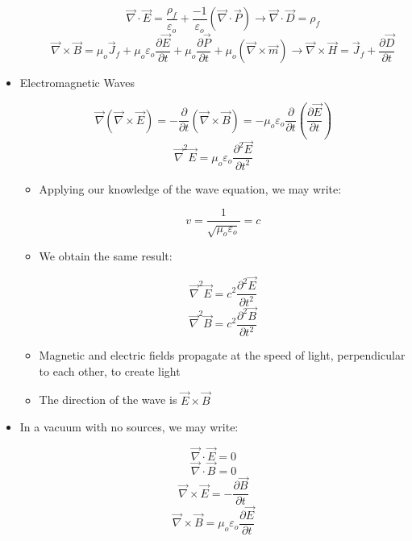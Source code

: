 \begin{itemize}
\begin{itemize}
        $$\vec{\nabla}\cdot\vec{E}=\frac{\rho_f}{\varepsilon_o}+\frac{-1}{\varepsilon_o}(\vec{\nabla}\cdot\vec{P})\rightarrow \vec{\nabla}\cdot\vec{D}=\rho_f$$
        $$\vec{\nabla}\times\vec{B}=\mu_o\vec{J}_f+\mu_o\varepsilon_o\frac{\partial\vec{E}}{\partial t}+\mu_o\frac{\partial\vec{P}}{\partial t}+\mu_o(\vec{\nabla}\times\vec{m})\rightarrow \vec{\nabla}\times\vec{H}=\vec{J}_f+\frac{\partial\vec{D}}{\partial t}$$

    \end{itemize}

  \item Electromagnetic Waves

    $$\vec{\nabla}(\vec{\nabla}\times\vec{E})=-\frac{\partial}{\partial t}(\vec{\nabla}\times\vec{B})=-\mu_o\varepsilon_o\frac{\partial}{\partial t}\left( \frac{\partial \vec{E}}{\partial t} \right)$$
    $$\vec{\nabla}^2\vec{E}=\mu_o\varepsilon_o\frac{\partial^2\vec{E}}{\partial t^2}$$

    \begin{itemize}

      \item Applying our knowledge of the wave equation, we may write:

        $$v=\frac{1}{\sqrt{\mu_o\varepsilon_o}}=c$$

      \item We obtain the same result:

        $$\vec{\nabla}^2\vec{E}=c^2\frac{\partial^2\vec{E}}{\partial t^2}$$
        $$\vec{\nabla}^2\vec{B}=c^2\frac{\partial^2\vec{B}}{\partial t^2}$$

      \item Magnetic and electric fields propagate at the speed of light, perpendicular to each other, to create light

      \item The direction of the wave is $\vec{E}\times\vec{B}$

    \end{itemize}

  \item In a vacuum with no sources, we may write:

    $$\vec{\nabla}\cdot\vec{E}=0$$
    $$\vec{\nabla}\cdot\vec{B}=0$$
    $$\vec{\nabla}\times\vec{E}=-\frac{\partial \vec{B}}{\partial t}$$
    $$\vec{\nabla}\times\vec{B}=\mu_o\varepsilon_o\frac{\partial\vec{E}}{\partial t}$$

    \begin{itemize}


\end{itemize}
\end{itemize}
